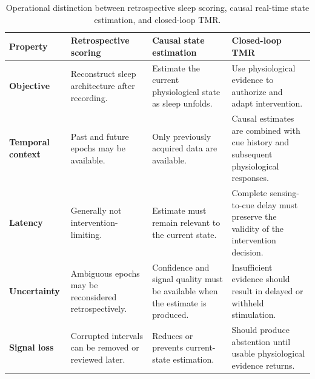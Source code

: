 \begin{table}[t]

\centering

\caption{
Operational distinction between retrospective sleep scoring, causal
real-time state estimation, and closed-loop TMR.
}

\label{tab:closed_loop_requirements}

\footnotesize
\setlength{\tabcolsep}{5pt}
\renewcommand{\arraystretch}{1.22}

\begin{tabularx}{\textwidth}{
@{}
>{\raggedright\arraybackslash}p{2.7cm}
>{\raggedright\arraybackslash}X
>{\raggedright\arraybackslash}X
>{\raggedright\arraybackslash}X
@{}
}

\toprule

\textbf{Property}
&
\textbf{Retrospective scoring}
&
\textbf{Causal state estimation}
&
\textbf{Closed-loop TMR}
\\

\midrule

\textbf{Objective}
&
Reconstruct sleep architecture after recording.
&
Estimate the current physiological state as sleep unfolds.
&
Use physiological evidence to authorize and adapt intervention.
\\

\addlinespace[1.2mm]

\textbf{Temporal context}
&
Past and future epochs may be available.
&
Only previously acquired data are available.
&
Causal estimates are combined with cue history and subsequent physiological
responses.
\\

\addlinespace[1.2mm]

\textbf{Latency}
&
Generally not intervention-limiting.
&
Estimate must remain relevant to the current state.
&
Complete sensing-to-cue delay must preserve the validity of the intervention
decision.
\\

\addlinespace[1.2mm]

\textbf{Uncertainty}
&
Ambiguous epochs may be reconsidered retrospectively.
&
Confidence and signal quality must be available when the estimate is produced.
&
Insufficient evidence should result in delayed or withheld stimulation.
\\

\addlinespace[1.2mm]

\textbf{Signal loss}
&
Corrupted intervals can be removed or reviewed later.
&
Reduces or prevents current-state estimation.
&
Should produce abstention until usable physiological evidence returns.
\\


\end{tabularx}
\end{table}
